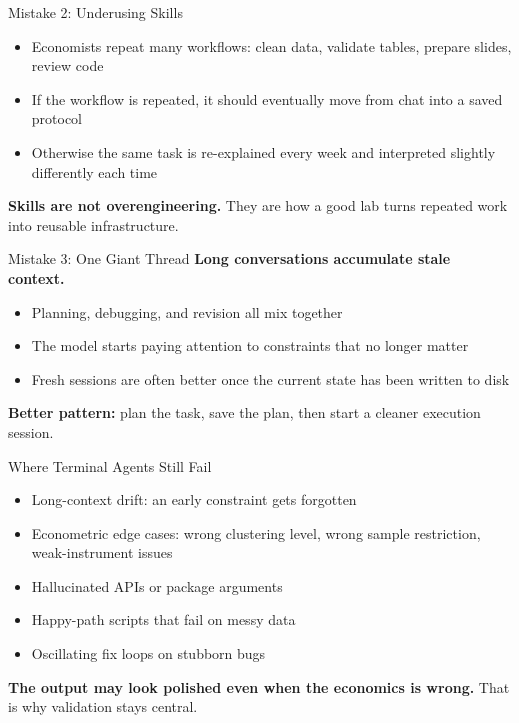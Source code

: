 \documentclass[10pt,english,aspectratio=169]{beamer}
\begin{document}
\begin{frame}{Mistake 2: Underusing Skills}
\begin{itemize}
    \item Economists repeat many workflows: clean data, validate tables, prepare slides, review code
    \item If the workflow is repeated, it should eventually move from chat into a saved protocol
    \item Otherwise the same task is re-explained every week and interpreted slightly differently each time
\end{itemize}

\vspace{0.3cm}

\textbf{Skills are not overengineering.} They are how a good lab turns repeated work into reusable infrastructure.
\end{frame}

\begin{frame}{Mistake 3: One Giant Thread}
\textbf{Long conversations accumulate stale context.}

\vspace{0.25cm}

\begin{itemize}
    \item Planning, debugging, and revision all mix together
    \item The model starts paying attention to constraints that no longer matter
    \item Fresh sessions are often better once the current state has been written to disk
\end{itemize}

\vspace{0.25cm}

\textbf{Better pattern:} plan the task, save the plan, then start a cleaner execution session.
\end{frame}

\begin{frame}{Where Terminal Agents Still Fail}
\begin{itemize}
    \item Long-context drift: an early constraint gets forgotten
    \item Econometric edge cases: wrong clustering level, wrong sample restriction, weak-instrument issues
    \item Hallucinated APIs or package arguments
    \item Happy-path scripts that fail on messy data
    \item Oscillating fix loops on stubborn bugs
\end{itemize}

\vspace{0.3cm}

\textbf{The output may look polished even when the economics is wrong.} That is why validation stays central.
\end{frame}
\end{document}

